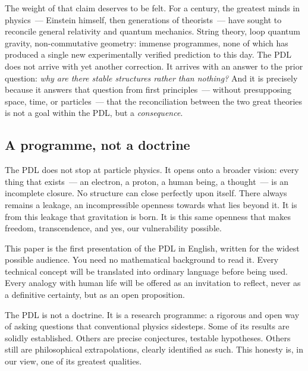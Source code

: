 \documentclass[12pt, a4paper, openright]{book}
\begin{document}
\medskip

The weight of that claim deserves to be felt. For a century, the greatest minds in physics~--- Einstein himself, then generations of theorists~--- have sought to reconcile general relativity and quantum mechanics. String theory, loop quantum gravity, non-commutative geometry: immense programmes, none of which has produced a single new experimentally verified prediction to this day. The PDL does not arrive with yet another correction. It arrives with an answer to the prior question: \emph{why are there stable structures rather than nothing?} And it is precisely because it answers that question from first principles~--- without presupposing space, time, or particles~--- that the reconciliation between the two great theories is not a goal within the PDL, but a \emph{consequence}.

\subsection*{A programme, not a doctrine}

The PDL does not stop at particle physics. It opens onto a broader vision: every thing that exists~--- an electron, a proton, a human being, a thought~--- is an incomplete closure. No structure can close perfectly upon itself. There always remains a leakage, an incompressible openness towards what lies beyond it. It is from this leakage that gravitation is born. It is this same openness that makes freedom, transcendence, and yes, our vulnerability possible.

\medskip

This paper is the first presentation of the PDL in English, written for the widest possible audience. You need no mathematical background to read it. Every technical concept will be translated into ordinary language before being used. Every analogy with human life will be offered as an invitation to reflect, never as a definitive certainty, but as an open proposition.

\medskip

The PDL is not a doctrine. It is a research programme: a rigorous and open way of asking questions that conventional physics sidesteps. Some of its results are solidly established. Others are precise conjectures, testable hypotheses. Others still are philosophical extrapolations, clearly identified as such. This honesty is, in our view, one of its greatest qualities.

\medskip
\end{document}
